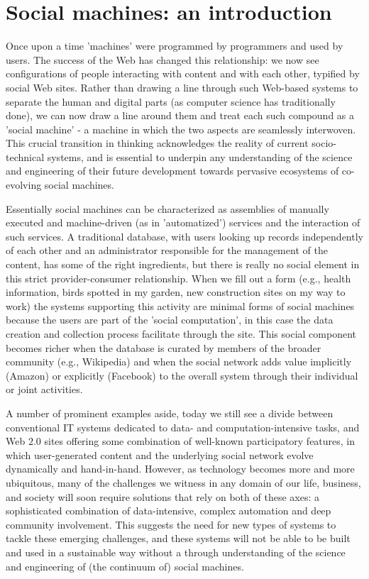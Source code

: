 \documentclass{sig-alternate}
\begin{document}
\section{Social machines: an introduction}
Once upon a time 'machines' were programmed by programmers and used by users. The success of the Web has changed this relationship: we now see configurations of people interacting with content and with each other, typified by social Web sites. Rather than drawing a line through such Web-based systems to separate the human and digital parts (as computer science has traditionally done), we can now draw a line around them  and  treat  each  such  compound  as  a  'social  machine'  -  a  machine in which the two aspects are seamlessly interwoven. This crucial transition in thinking acknowledges the reality of current socio-technical systems, and is essential to underpin any understanding of the science and engineering of their future development towards pervasive ecosystems of co-evolving social machines.

Essentially social machines can be characterized as assemblies of manually executed and machine-driven (as in 'automatized') services and the interaction of such services. A  traditional  database,  with  users  looking  up  records  independently  of  each  other  and  an  administrator responsible for the management of the content, has some of the right ingredients, but there is really no social element in this strict provider-consumer relationship. When we fill out a form (e.g., health information, birds spotted in my garden, new construction sites on my way to work) the systems supporting this activity are minimal forms of social machines  because the users  are  part  of  the  'social  computation', in this case the data creation and collection process facilitate through the site.  This social component  becomes  richer when  the database  is  curated by members  of  the broader community (e.g., Wikipedia) and when  the social network adds value implicitly (Amazon) or explicitly (Facebook) to the overall system through their individual or joint activities.

A number of prominent examples aside, today we still see a divide between conventional IT systems dedicated to data- and computation-intensive tasks, and Web $2.0$ sites offering some combination of well-known participatory features, in which user-generated content and the underlying social network evolve dynamically and hand-in-hand. However, as technology becomes more and more ubiquitous, many of the challenges we witness in any domain of our life, business, and society will soon require solutions that rely on both of these axes: a sophisticated  combination  of  data-intensive, complex automation and deep community involvement. This suggests the need for new types of systems to tackle these emerging challenges, and these systems will not be able to be built and used in a sustainable way without a through understanding of the science and engineering of (the continuum of) social machines.
\end{document}
